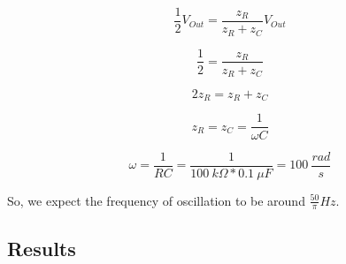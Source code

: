 \documentclass[11pt]{article}
\begin{document}
\begin{equation}
    \frac{1}{2} V_{Out} = \frac{z_R}{z_R + z_C} V_{Out}
\end{equation}

\begin{equation}
    \frac{1}{2} = \frac{z_R}{z_R + z_C}
\end{equation}

\begin{equation}
    2 z_R = z_R + z_C
\end{equation}

\begin{equation}
    z_R = z_C = \frac{1}{\omega C}
\end{equation}

\begin{equation}
    \omega = \frac{1}{RC} = \frac{1}{100\ k \Omega * 0.1\ \mu F} = 100\ \frac{rad}{s}
\end{equation}

So, we expect the frequency of oscillation to be around $\frac{50}{\pi} Hz$.


\subsection{Results}
\end{document}

